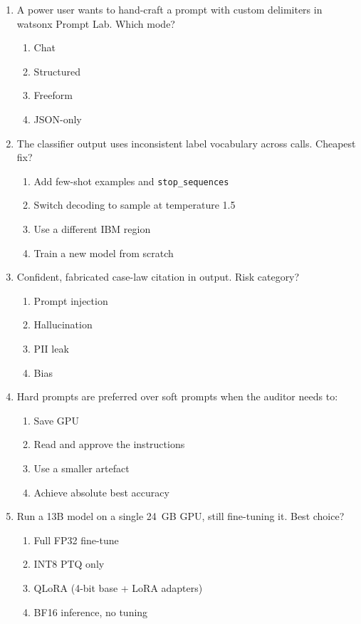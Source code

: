 \begin{enumerate}[leftmargin=*]
\item A power user wants to hand-craft a prompt with custom delimiters in watsonx Prompt Lab. Which mode?
\begin{enumerate}[label=\Alph*.]
  \item Chat \item Structured \item Freeform \item JSON-only
\end{enumerate}

\item The classifier output uses inconsistent label vocabulary across calls. Cheapest fix?
\begin{enumerate}[label=\Alph*.]
  \item Add few-shot examples and \texttt{stop\_sequences}
  \item Switch decoding to sample at temperature 1.5
  \item Use a different IBM region \item Train a new model from scratch
\end{enumerate}

\item Confident, fabricated case-law citation in output. Risk category?
\begin{enumerate}[label=\Alph*.]
  \item Prompt injection \item Hallucination \item PII leak \item Bias
\end{enumerate}

\item Hard prompts are preferred over soft prompts when the auditor needs to:
\begin{enumerate}[label=\Alph*.]
  \item Save GPU \item Read and approve the instructions
  \item Use a smaller artefact \item Achieve absolute best accuracy
\end{enumerate}

\item Run a 13B model on a single 24~GB GPU, still fine-tuning it. Best choice?
\begin{enumerate}[label=\Alph*.]
  \item Full FP32 fine-tune \item INT8 PTQ only
  \item QLoRA (4-bit base + LoRA adapters) \item BF16 inference, no tuning
\end{enumerate}


\end{enumerate}
